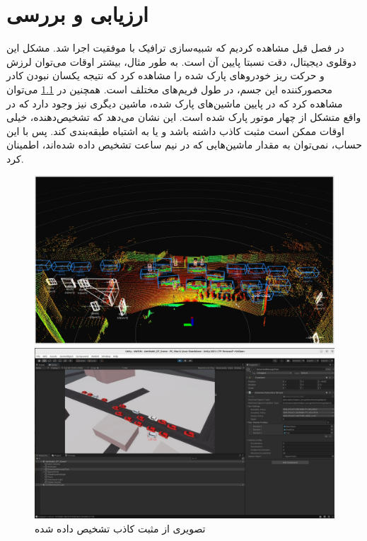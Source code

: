 \chapter{ارزیابی و بررسی}
در فصل قبل مشاهده کردیم که شبیه‌سازی ترافیک با موفقیت اجرا شد. مشکل این دوقلوی دیجیتال، دقت نسبتا پایین آن است. به طور مثال، بیشتر اوقات می‌توان لرزش و حرکت ریز خودرو‌های پارک شده را مشاهده کرد که نتیجه یکسان نبودن کادر محصورکننده این جسم، در طول فریم‌های مختلف است. همچنین در \cref{fig:DT_False_Positive} می‌توان مشاهده کرد که در پایین ماشین‌های پارک شده، ماشین دیگری نیز وجود دارد که در واقع متشکل از چهار موتور پارک‌ شده است. این نشان می‌دهد که تشخیص‌دهنده، خیلی اوقات ممکن است مثبت کاذب داشته باشد و یا به اشتباه طبقه‌بندی کند. پس با این حساب، نمی‌توان به مقدار ماشین‌هایی که در نیم ساعت تشخیص داده شده‌اند، اطمینان کرد. 

\begin{figure}[h!]
    \centering
    \begin{minipage}{0.8\textwidth}
        \includegraphics[width=1\linewidth]{figures/3D_Detection_FP.png}
    \end{minipage}
    \vspace{0.3cm}
    \begin{minipage}{0.8\textwidth}
        \includegraphics[width=1\linewidth]{figures/Amirkabir_DT_FP.png}
    \end{minipage}
    \caption{تصویری از مثبت کاذب تشخیص ‌داده شده}
    \label{fig:DT_False_Positive}
\end{figure}

